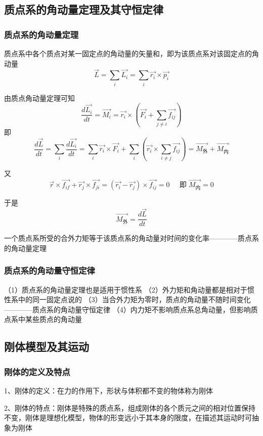 \documentclass[UTF8]{article}
\begin{document}
\subsection{质点系的角动量定理及其守恒定律}
\subsubsection{质点系的角动量定理}

    质点系中各个质点对某一固定点的角动量的矢量和，即为该质点系对该固定点的角动量\[\vec{L} = \sum_i\vec{L_i} = \sum_i\vec{r_i}\times\vec{p_i}\]

    由质点角动量定理可知\[\frac{d\vec{L_i}}{dt} = \vec{M_i} = \vec{r_i}\times(\vec{F_i}+\sum_{j\neq i}\vec{f_{ij}})\]即\[\frac{d\vec{L}}{dt} = \sum_i\frac{d\vec{L_i}}{dt} = \sum_i\vec{r_i}\times\vec{F_i} + \sum_i(\vec{r_i}\times\sum_{i\neq j}\vec{f_{ij}}) = \vec{M_{\mbox{外}}} + \vec{M_{\mbox{内}}}\]

    又\[\vec{r}\times\vec{f_{if}} + \vec{r_j}\times\vec{f_{ji}} = (\vec{r_i} - \vec{r_j})\times\vec{f_{ij}} = 0\;\;\;\;\;\mbox{即}\;\vec{M_{\mbox{内}}} = 0\]

    于是\[\vec{M_{\mbox{外}}} = \frac{d\vec{L}}{dt}\]

    一个质点系所受的合外力矩等于该质点系的角动量对时间的变化率————质点系的角动量定理

\subsubsection{质点系的角动量守恒定律}

    （1）质点系的角动量定理也是适用于惯性系
    （2）外力矩和角动量都是相对于惯性系中的同一固定点说的
    （3）当合外力矩为零时，质点的角动量不随时间变化————质点系的角动量守恒定律
    （4）内力矩不影响质点系总角动量，但影响质点系中某些质点的角动量

\subsection{刚体模型及其运动}
\subsubsection{刚体的定义及特点}

    1、刚体的定义：在力的作用下，形状与体积都不变的物体称为刚体

    2、刚体的特点：刚体是特殊的质点系，组成刚体的各个质元之间的相对位置保持不变，刚体是理想化模型，物体的形变远小于其本身的限度，在描述其运动时可抽象为刚体
\end{document}
